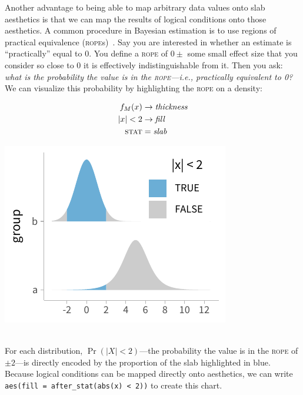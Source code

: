 \documentclass[journal]{vgtc}                     %
\newcommand{\equationfigure}[2]{%
\noindent
\begin{minipage}{.5\columnwidth}
\setlength{\abovedisplayskip}{0pt}
\setlength{\belowdisplayskip}{0pt}
#1\end{minipage}%
\begin{minipage}{.4\columnwidth}\centering #2 \end{minipage}%
\vspace{.5\belowdisplayskip}\\
}
\begin{document}
Another advantage to being able to map arbitrary data values onto slab aesthetics is that we can map the results of logical conditions onto those aesthetics. A common procedure in Bayesian estimation is to use regions of practical equivalence (\textsc{rope}s)~\cite{kruschke2018rejecting}. Say you are interested in whether an estimate is ``practically'' equal to 0. You define a \textsc{rope} of $0\pm$ some small effect size that you consider so close to 0 it is effectively indistinguishable from it. Then you ask: \textit{what is the probability the value is in the \textsc{rope}---i.e., practically equivalent to 0?} We can visualize this probability by highlighting the \textsc{rope} on a density:

\equationfigure{
\begin{align*}
f_M(x) &\rightarrow \textit{thickness}\\
\lvert x \rvert < 2 &\rightarrow \textit{fill}\\
\textsc{stat} &= \mathit{slab}
\end{align*}
}{\includegraphics[width=1.2\columnwidth]{figs/3-slab_rope.pdf}}
For each distribution, $\Pr(\lvert X \rvert < 2)$---the probability the value is in the \textsc{rope} of $\pm2$---is directly encoded by the proportion of the slab highlighted in blue. Because logical conditions can be mapped directly onto aesthetics, we can write \texttt{aes(fill = after\_stat(abs(x) < 2))} to create this chart.
\end{document}
